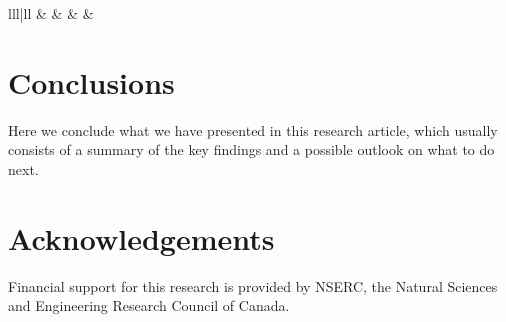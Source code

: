 \documentclass[runningheads]{llncs}
\begin{document}
\begin{table}[htdp]
\begin{center}
\begin{tabular}{lll|ll}
	 & 
	 & 
	 & 
	 & 
	 \\
	\hline
\end{tabular}
\end{center}
\label{default}
\end{table}




\section{Conclusions}
\label{sec:Conclusions}
Here we conclude what we have presented in this research article, which usually consists of a summary of the key findings and a possible outlook on what to do next.



\section*{Acknowledgements}
Financial support for this research is provided by NSERC, the Natural Sciences and Engineering Research Council of Canada.








\end{document}
